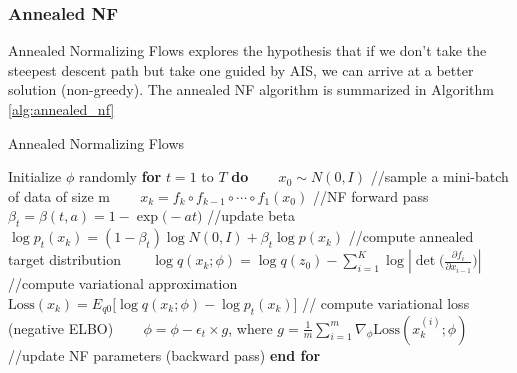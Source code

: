 \subsubsection{Annealed NF}

Annealed Normalizing Flows explores the hypothesis that if we don't take the steepest descent path but take one guided by AIS, we can arrive at a better solution (non-greedy). The annealed NF algorithm is summarized in Algorithm \ref{alg:annealed_nf}\\

\begin{algorithm}
\caption{Annealed Normalizing Flows}
\label{alg:annealed_nf}
\begin{algorithmic}[1]
\STATE Initialize $\phi$ randomly
\STATE \textbf{for} $t = 1$ to $T$ \textbf{do} 
\STATE ~~~ $x_0 \sim N(0, I)$ //sample a mini-batch of data of size m
\STATE ~~~ $x_k = f_k \circ f_{k-1} \circ \cdots \circ f_1(x_0)$ //NF forward pass
\STATE ~~~ $\beta_t = \beta(t, a) = 1-\exp \big(-at\big)$ //update beta
\STATE ~~~ $\log p_t(x_k) = (1-\beta_t)\log N(0, I) + \beta_t \log p(x_k)$ //compute annealed target distribution
\STATE ~~~ $\log q(x_k; \phi) = \log q(z_0) - \sum_{i=1}^{K}\log | \det \bigg(\frac{\partial f_i}{\partial x_{i-1}} \bigg)|$ //compute variational approximation
\STATE ~~~ $\mathrm{Loss}(x_k) = E_{q0}\bigg[\log q(x_k; \phi) - \log p_t(x_k)\bigg]$ // compute variational loss (negative ELBO)
\STATE ~~~ $\phi = \phi - \epsilon_t \times g$, where $g = \frac{1}{m}\sum_{i=1}^{m}\nabla_{\phi}\mathrm{Loss}(x_{k}^{(i)}; \phi)$ //update NF parameters (backward pass)
\STATE \textbf{end for}
\end{algorithmic}
\end{algorithm}

